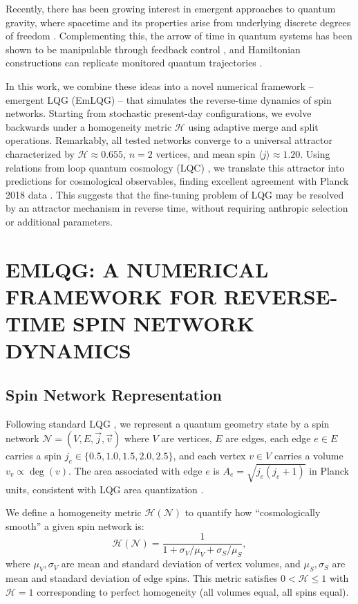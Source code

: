 \documentclass[twocolumn,aps,prd,showpacs,preprintnumbers,longbibliography]{revtex4-2}
\begin{document}
	Recently, there has been growing interest in emergent approaches to quantum gravity, where spacetime and its properties arise from underlying discrete degrees of freedom \cite{Markopoulou2009, Oriti2014, Carrozza2022}. Complementing this, the arrow of time in quantum systems has been shown to be manipulable through feedback control \cite{Dressel2017, Manikandan2022, Harrington2019, Jayaseelan2021}, and Hamiltonian constructions can replicate monitored quantum trajectories \cite{Hu2023, Hu2024}.
	
	In this work, we combine these ideas into a novel numerical framework -- emergent LQG (EmLQG) -- that simulates the reverse-time dynamics of spin networks. Starting from stochastic present-day configurations, we evolve backwards under a homogeneity metric $\mathcal{H}$ using adaptive merge and split operations. Remarkably, all tested networks converge to a universal attractor characterized by $\mathcal{H} \approx 0.655$, $n=2$ vertices, and mean spin $\langle j \rangle \approx 1.20$. Using relations from loop quantum cosmology (LQC) \cite{AshtekarSingh2011, Agullo2013, AshtekarSloan2011}, we translate this attractor into predictions for cosmological observables, finding excellent agreement with Planck 2018 data \cite{Planck2018,Planck2020}. This suggests that the fine-tuning problem of LQG may be resolved by an attractor mechanism in reverse time, without requiring anthropic selection or additional parameters.
	
	\section{EMLQG: A NUMERICAL FRAMEWORK FOR REVERSE-TIME SPIN NETWORK DYNAMICS}
	
	\subsection{Spin Network Representation}
	
	Following standard LQG \cite{Rovelli2004}, we represent a quantum geometry state by a spin network $\mathcal{N} = (V, E, \vec{j}, \vec{v})$ where $V$ are vertices, $E$ are edges, each edge $e \in E$ carries a spin $j_e \in \{0.5, 1.0, 1.5, 2.0, 2.5\}$, and each vertex $v \in V$ carries a volume $v_v \propto \deg(v)$. The area associated with edge $e$ is $A_e = \sqrt{j_e(j_e+1)}$ in Planck units, consistent with LQG area quantization \cite{Rovelli1995, Ashtekar1996}.
	
	We define a homogeneity metric $\mathcal{H}(\mathcal{N})$ to quantify how ``cosmologically smooth'' a given spin network is:
	\begin{equation}
		\mathcal{H}(\mathcal{N}) = \frac{1}{1 + \sigma_V/\mu_V + \sigma_S/\mu_S},
		\label{eq:homogeneity}
	\end{equation}
	where $\mu_V, \sigma_V$ are mean and standard deviation of vertex volumes, and $\mu_S, \sigma_S$ are mean and standard deviation of edge spins. This metric satisfies $0 < \mathcal{H} \le 1$ with $\mathcal{H} = 1$ corresponding to perfect homogeneity (all volumes equal, all spins equal).
	
\end{document}
